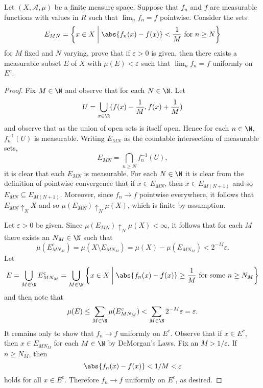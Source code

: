 \documentclass[12pt]{amsart}
\begin{document}
\begin{thm}
  Let $(X, \mathcal{A}, \mu)$ be a finite measure space.
  Suppose that $f_n$ and $f$ are measurable functions with values in $R$ such that $\lim_n f_n = f$ pointwise.
  Consider the sets
  $$E_{MN} = \left\{x \in X \;\middle\vert\; \abs{f_n(x) - f(x)} < \frac{1}{M}\ \text{for}\ n \geq N\right\}$$
  for $M$ fixed and $N$ varying, prove that if $\varepsilon > 0$ is given, then there exists a measurable subset $E$ of $X$ with $\mu(E) < \varepsilon$ such that $\lim_n f_n = f$ uniformly on $E^c$.
  \begin{proof}
    Fix $M \in \N$ and observe that for each $N \in \N$.
    Let $$U = \bigcup_{x \in \R} (f(x) - \frac{1}{M}, f(x) + \frac{1}{M})$$
    and observe that as the union of open sets is itself open.
    Hence for each $n \in \N$, $f_n^{-1}(U)$ is measurable.
    Writing $E_{MN}$ as the countable intersection of measurable sets,
    $$E_{MN} = \bigcap_{n \geq N} f_n^{-1}(U),$$
    it is clear that each $E_{MN}$ is measurable.
    For each $N \in \N$ it is clear from the definition of pointwise convergence that if $x \in E_{MN}$, then $x \in E_{M(N+1)}$ and so $E_{MN} \subseteq E_{M(N+1)}$.
    Moreover, since $f_n \rightarrow f$ pointwise everywhere, it follows that $E_{MN} \uparrow_N X$ and so $\mu(E_{MN}) \uparrow_N \mu(X)$, which is finite by assumption.
    
    Let $\varepsilon > 0$ be given.
    Since $\mu(E_{MN}) \uparrow_N \mu(X) < \infty$, it follows that for each $M$ there exists an $N_M \in \N$ such that 
    $$\mu(E_{MN_M}^c) = \mu(X \setminus E_{MN_M}) = \mu(X) - \mu(E_{MN_M}) < 2^{-M}\varepsilon.$$
    Let 
    $$E = \bigcup_{M \in \N} E_{MN_M}^c = \bigcup_{M \in \N} \left\{x \in X \;\middle\vert\; \abs{f_n(x) - f(x)} \geq \frac{1}{M}\ \text{for some}\ n \geq N_M \right\}$$
    and then note that
    $$\mu(E) \leq \sum_{M \in \N} \mu(E_{MN_M}^c) < \sum_{M \in \N} 2^{-M}\varepsilon = \varepsilon.$$
    It remains only to show that $f_n \rightarrow f$ uniformly on $E^c$.
    Observe that if $x \in E^c$, then $x \in E_{MN_M}$ for each $M \in \N$ by DeMorgan's Laws.
    Fix an $M > 1/\varepsilon$.
    If $n \geq N_M$, then
    $$\abs{f_n(x) - f(x)} < 1/M < \varepsilon$$
    holds for all $x \in E^c$.
    Therefore $f_n \rightarrow f$ uniformly on $E^\text{c}$, as desired.
  \end{proof}
\end{thm}
\pagebreak
  
\end{document}
